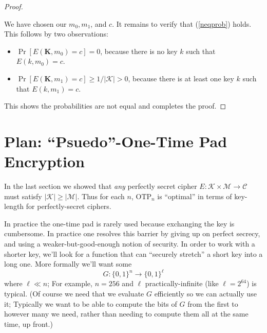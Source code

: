 \documentclass[11pt]{article}
\newcommand{\msgs}{\mathcal{M}}
\newcommand{\ctxts}{\mathcal{C}}
\newcommand{\keys}{\mathcal{K}}
\newcommand{\bits}{\{0,1\}}
\newcommand{\bK}{\mathbf{K}}
\newcommand{\otp}{\mathrm{OTP}}
\begin{document}
\begin{proof}
\begin{center}
    \end{center}
    We have chosen our $m_0,m_1$, and $c$. It remains to verify that
    (\ref{neqprob}) holds. This follows by two observations:
    \begin{itemize}
        \item $\Pr[E(\bK,m_0)=c] = 0$, because there is no key $k$ such
            that $E(k,m_0)=c$.
        \item $\Pr[E(\bK,m_1)=c] \geq 1/|\keys| > 0$, because there
            is at least one key $k$ such that $E(k,m_1)=c$.
    \end{itemize}
    This shows the probabilities are not equal and completes the proof.
\end{proof}


\section{Plan:  ``Psuedo''-One-Time Pad Encryption}

In the last section we showed that \emph{any} perfectly secret cipher
$E:\keys\times\msgs\to\ctxts$ must satisfy $|\keys| \geq |\msgs|$.
Thus for each $n$, $\otp_n$ is ``optimal'' in terms of key-length
for perfectly-secret ciphers.

In practice the one-time pad is rarely used because exchanging the key is
cumbersome. In practice one resolves this barrier by giving up on perfect
secrecy, and using a weaker-but-good-enough notion of security. In order
to work with a shorter key, we'll look for a function that can ``securely
stretch'' a short key into a long one. More formally we'll want some
\[
    G:\bits^n \to \bits^\ell
\]
where $\ell \ll n$; For example, $n=256$ and $\ell$ practically-infinite (like
$\ell=2^{64}$) is typical. (Of course we need that we evaluate $G$ efficiently
so we can actually use it; Typically we want to be able to compute the bits of
$G$ from the first to however many we need, rather than needing to compute them
all at the same time, up front.)
\end{document}
